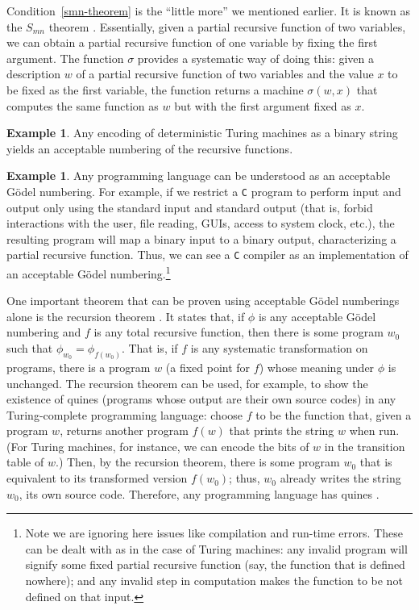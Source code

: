 \documentclass[12pt]{article}
\theoremstyle{definition}
\newtheorem{example}[definition]{Example}
\begin{document}
Condition~\ref{smn-theorem} is the ``little more'' we mentioned earlier.
It is known as the $S_{mn}$ theorem \cite[p.~24]{Rogers1987}.
Essentially,
given a partial recursive function of two variables,
we can obtain a partial recursive function of one variable
by fixing the first argument.
The function $\sigma$ provides a systematic way of doing this:
given a description $w$ of a partial recursive function of two variables
and the value $x$ to be fixed as the first variable,
the function returns a machine $\sigma(w, x)$
that computes the same function as $w$ but with the first argument fixed as $x$.

\begin{example}\label{standard-numbering}
    Any encoding of deterministic Turing machines as a binary string
    yields an acceptable numbering of the recursive functions.
\end{example}

\begin{example}\label{c}
    Any programming language can be understood as an acceptable Gödel numbering.
    For example,
    if we restrict a \texttt C program
    to perform input and output only using the standard input and standard output
    (that is, forbid interactions with the user, file reading, GUIs,
    access to system clock, etc.),
    the resulting program will map a binary input to a binary output,
    characterizing a partial recursive function.
    Thus, we can see a \texttt C compiler
    as an implementation of an acceptable Gödel numbering.\footnote{
        Note we are ignoring here issues like compilation and run-time errors.
        These can be dealt with as in the case of Turing machines:
        any invalid program will signify some fixed partial recursive function
        (say, the function that is defined nowhere);
        and any invalid step in computation
        makes the function to be not defined on that input.
    }
\end{example}

One important theorem that can be proven using acceptable Gödel numberings alone
is the recursion theorem
\cite[p.~181]{Rogers1987}.
It states that, if $\phi$ is any acceptable Gödel numbering
and $f$ is any total recursive function,
then there is some program $w_0$ such that $\phi_{w_0} = \phi_{f(w_0)}$.
That is,
if $f$ is any systematic transformation on programs,
there is a program $w$ (a fixed point for $f$) whose meaning under $\phi$ is unchanged.
The recursion theorem can be used,
for example, to show the existence of quines
(programs whose output are their own source codes)
in any Turing-complete programming language:
choose $f$ to be the function that, given a program $w$,
returns another program $f(w)$ that prints the string $w$ when run.
(For Turing machines, for instance,
we can encode the bits of $w$ in the transition table of $w$.)
Then, by the recursion theorem,
there is some program $w_0$ that is equivalent to its transformed version $f(w_0)$;
thus, $w_0$ already writes the string $w_0$, its own source code.
Therefore, any programming language has quines \cite[p.~227]{Kozen2006}.
\end{document}

